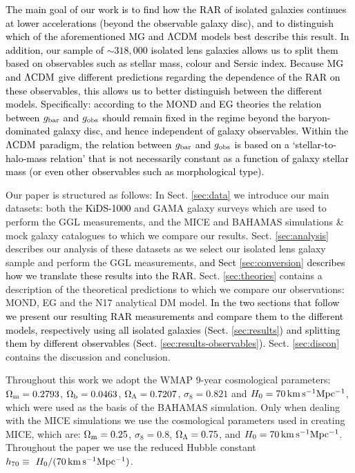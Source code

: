 \documentclass[usenatbib]{mnras}
\newcommand{\lcdm}{{\rm \Lambda CDM}}
\newcommand{\un}[1]{_{\rm #1}}
\begin{document}
\textcolor{black}{The main goal of our work is to find how the RAR of isolated galaxies continues at lower accelerations (beyond the observable galaxy disc), and to distinguish which of the aforementioned MG and $\lcdm$ models best describe this result. In addition, our sample of $\sim318,000$ isolated lens galaxies allows us to split them based on observables such as stellar mass, colour and Sersic index. Because MG and $\lcdm$ give different predictions regarding the dependence of the RAR on these observables, this allows us to better distinguish between the different models. Specifically: according to the MOND and EG theories the relation between $g\un{bar}$ and $g\un{obs}$ should remain fixed in the regime beyond the baryon-dominated galaxy disc, and hence independent of galaxy observables. Within the $\lcdm$ paradigm, the relation between $g\un{bar}$ and $g\un{obs}$ is based on a `stellar-to-halo-mass relation' that is not necessarily constant as a function of galaxy stellar mass (or even other observables such as morphological type).}

Our paper is structured as follows: In Sect. \ref{sec:data} we introduce our main datasets: both the \textcolor{black}{KiDS-1000} and GAMA galaxy surveys which are used to perform the GGL measurements, and the MICE and BAHAMAS simulations \& mock galaxy catalogues to which we compare our results. Sect. \ref{sec:analysis} describes our analysis of these datasets as we select our isolated lens galaxy sample and perform the GGL measurements, \textcolor{black}{and Sect \ref{sec:conversion} describes how we translate these results into the RAR.} Sect. \ref{sec:theories} contains a description of the theoretical predictions to which we compare our observations: MOND, EG and the N17 analytical DM model. \textcolor{black}{In the two sections that follow we present our resulting RAR measurements and compare them to the different models, respectively using all isolated galaxies (Sect. \ref{sec:results}) and splitting them by different observables (Sect. \ref{sec:results-observables}).} Sect. \ref{sec:discon} contains the discussion and conclusion.

Throughout this work we adopt the WMAP 9-year \cite[]{hinshaw2013} cosmological parameters: $\Omega\un{m}=0.2793$, $\Omega\un{b}=0.0463$, $\Omega\un{\Lambda}=0.7207$, $\sigma_8=0.821$ and $H_0 = 70 \, {\rm km \, s^{-1} Mpc^{-1}}$, which were used as the basis of the BAHAMAS simulation. Only when dealing with the MICE simulations we use the cosmological parameters used in creating MICE, which are: $\Omega\un{m}=0.25$, $\sigma_8=0.8$, $\Omega\un{\Lambda}=0.75$, and $H_0 = 70 \, {\rm km \, s^{-1} Mpc^{-1}}$. Throughout the paper we use the reduced Hubble constant $h_{70} \equiv \ H_0 / (70 \, {\rm km \, s^{-1} Mpc^{-1}})$.
\end{document}
